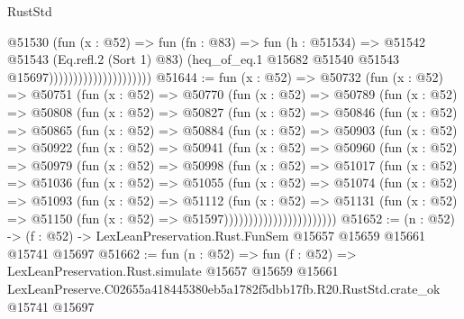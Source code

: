 \begin{lexlean}{RustStd}
\begin{coremodule}
                                        @51530
                                          (fun (x : @52) =>
                                          fun (fn : @83) =>
                                          fun (h : @51534) =>
                                          @51542
                                            @51543
                                            (Eq.refl.{2} (Sort 1) @83)
                                            (heq_of_eq.{1}
                                              @15682
                                              @51540
                                              @51543
                                              @15697)))))))))))))))))))))
@51644 := fun (x : @52) =>
  @50732
    (fun (x : @52) =>
    @50751
      (fun (x : @52) =>
      @50770
        (fun (x : @52) =>
        @50789
          (fun (x : @52) =>
          @50808
            (fun (x : @52) =>
            @50827
              (fun (x : @52) =>
              @50846
                (fun (x : @52) =>
                @50865
                  (fun (x : @52) =>
                  @50884
                    (fun (x : @52) =>
                    @50903
                      (fun (x : @52) =>
                      @50922
                        (fun (x : @52) =>
                        @50941
                          (fun (x : @52) =>
                          @50960
                            (fun (x : @52) =>
                            @50979
                              (fun (x : @52) =>
                              @50998
                                (fun (x : @52) =>
                                @51017
                                  (fun (x : @52) =>
                                  @51036
                                    (fun (x : @52) =>
                                    @51055
                                      (fun (x : @52) =>
                                      @51074
                                        (fun (x : @52) =>
                                        @51093
                                          (fun (x : @52) =>
                                          @51112
                                            (fun (x : @52) =>
                                            @51131
                                              (fun (x : @52) =>
                                              @51150 (fun (x : @52) => @51597)))))))))))))))))))))))
@51652 := (n : @52) ->
  (f : @52) -> LexLeanPreservation.Rust.FunSem @15657 @15659 @15661 @15741 @15697
@51662 := fun (n : @52) =>
  fun (f : @52) =>
  LexLeanPreservation.Rust.simulate
    @15657
    @15659
    @15661
    LexLeanPreserve.C02655a418445380eb5a1782f5dbb17fb.R20.RustStd.crate_ok
    @15741
    @15697
\end{coremodule}
\end{lexlean}
